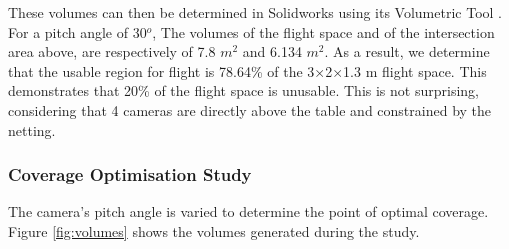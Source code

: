 These volumes can then be determined in Solidworks using its Volumetric Tool \cite{solidworks_docs}.
For a pitch angle of 30$^o$, The volumes of the flight space and of the intersection area above, are respectively of 7.8 $m^2$ and 6.134 $m^2$. As a result, we determine that the usable region for flight is 78.64\% of the 3×2×1.3 m flight space. This demonstrates that 20\% of the flight space is unusable. This is not surprising, considering that 4 cameras are directly above the table and constrained by the netting.





\pagebreak
\subsubsection{Coverage Optimisation Study}

The camera's pitch angle is varied to determine the point of optimal coverage. Figure \ref{fig:volumes} shows the volumes generated during the study.

